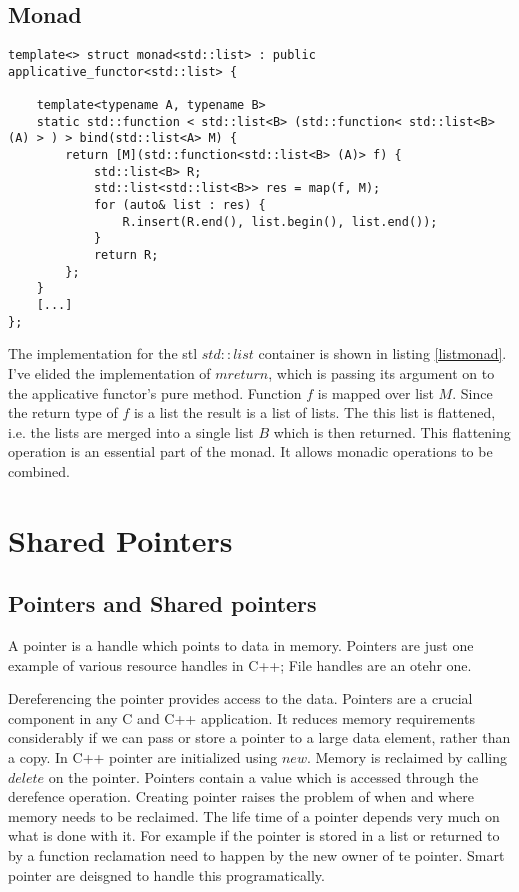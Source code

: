 \documentclass[12pt,fleqn]{article}
\begin{document}
%
%
\subsection{Monad}
%
  
  
%
%
%
\begin{minipage}{\linewidth}
\begin{lstlisting}[caption=monad for std::list, label=listmonad]
template<> struct monad<std::list> : public applicative_functor<std::list> {

	template<typename A, typename B>
	static std::function < std::list<B> (std::function< std::list<B> (A) > ) > bind(std::list<A> M) {
		return [M](std::function<std::list<B> (A)> f) {
			std::list<B> R;
			std::list<std::list<B>> res = map(f, M);
			for (auto& list : res) {
				R.insert(R.end(), list.begin(), list.end());
			}
			return R;
		};
	}
    [...]
};
\end{lstlisting}
\end{minipage}
%
%
%
The implementation for the stl $std::list$ container is shown in listing \ref{listmonad}.
I've elided the implementation of $mreturn$, which is passing its argument on to the applicative functor's pure method.
Function $f$ is mapped over list $M$. Since the return type of $f$ is a list the result is a list of lists.
The this list is flattened, i.e. the lists are merged into a single list $B$ which is then returned.
This flattening operation is an essential part of the monad. It allows monadic operations to be combined.

\section{Shared Pointers}

  

\subsection{Pointers and Shared pointers}
%
%
%

A pointer is a handle which points to data in memory.
Pointers are just one example of various resource handles in C++; File handles are an otehr one.

Dereferencing the pointer provides access to the data.
Pointers are a crucial component in any C and C++ application.
It reduces memory requirements considerably if we can pass or store a pointer to a large data element, rather than a copy.
In C++ pointer are initialized using $new$. 
Memory is reclaimed by calling $delete$ on the pointer.
Pointers contain a value which is accessed through the derefence operation.
Creating pointer raises the problem of when and where memory needs to be reclaimed.
The life time of a pointer depends very much on what is done with it.
For example if the pointer is stored in a list or returned to by a function reclamation need to happen by the new owner of te pointer.
Smart pointer are deisgned to handle this programatically.
\end{document}
